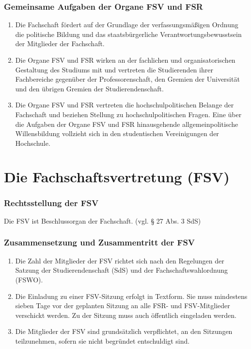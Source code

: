 \documentclass{article}
\begin{document}
\section{Gemeinsame Aufgaben der Organe FSV und FSR}
\begin{enumerate}[(1)]
\item Die Fachschaft fördert auf der Grundlage der verfassungsmäßigen Ordnung die politische Bildung und das staatsbürgerliche Verantwortungsbewusstsein der Mitglieder der Fachschaft.
\item Die Organe FSV und FSR wirken an der fachlichen und organisatorischen Gestaltung des Studiums mit und vertreten die Studierenden ihrer Fachbereiche gegenüber der Professorenschaft, den Gremien der Universität und den übrigen Gremien der Studierendenschaft.
\item Die Organe FSV und FSR vertreten die hochschulpolitischen Belange der Fachschaft und beziehen Stellung zu hochschulpolitischen Fragen. Eine über die Aufgaben der Organe FSV und FSR hinausgehende allgemeinpolitische Willensbildung vollzieht sich in den studentischen Vereinigungen der Hochschule.
\end{enumerate}

\part{Die Fachschaftsvertretung (FSV)}
\section{Rechtsstellung der FSV}
Die FSV ist Beschlussorgan der Fachschaft. (vgl. § 27 Abs. 3 SdS)

\section{Zusammensetzung und Zusammentritt der FSV}
\begin{enumerate}[(1)]
\item Die Zahl der Mitglieder der FSV richtet sich nach den Regelungen der Satzung der Studierendenschaft (SdS) und der Fachschaftswahlordnung (FSWO).
\item Die Einladung zu einer FSV-Sitzung erfolgt in Textform. Sie muss mindestens sieben Tage vor der geplanten Sitzung an alle FSR- und FSV-Mitglieder verschickt werden. Zu der Sitzung muss auch öffentlich eingeladen werden.
\item Die Mitglieder der FSV sind grundsätzlich verpflichtet, an den Sitzungen teilzunehmen, sofern sie nicht begründet entschuldigt sind.
\end{enumerate}
\end{document}
